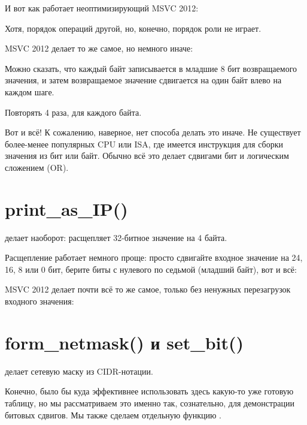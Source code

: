И вот как работает неоптимизирующий MSVC 2012:



Хотя, порядок операций другой, но, конечно, порядок роли не играет.

\Optimizing MSVC 2012 делает то же самое, но немного иначе:



Можно сказать, что каждый байт записывается в младшие 8 бит возвращаемого значения,
и затем возвращаемое значение сдвигается на один байт влево на каждом шаге.

Повторять 4 раза, для каждого байта.

\par
Вот и всё! 
К сожалению, наверное, нет способа делать это иначе.
Не существует более-менее популярных \ac{CPU} или \ac{ISA}, где имеется инструкция для сборки значения из бит или байт.
Обычно всё это делает сдвигами бит и логическим сложением (OR).

\section{print\_as\_IP()}

 делает наоборот: расщепляет 32-битное значение на 4 байта.

Расщепление работает немного проще: просто сдвигайте входное значение на 24, 16, 8 или 0 бит,
берите биты с нулевого по седьмой (младший байт), вот и всё:



\Optimizing MSVC 2012 делает почти всё то же самое, только без ненужных перезагрузок входного значения:



\section{form\_netmask() и set\_bit()}

 делает сетевую маску из \ac{CIDR}-нотации.

Конечно, было бы куда эффективнее использовать здесь какую-то уже готовую таблицу, но мы рассматриваем
это именно так, сознательно, для демонстрации битовых сдвигов.
Мы также сделаем отдельную функцию . 

